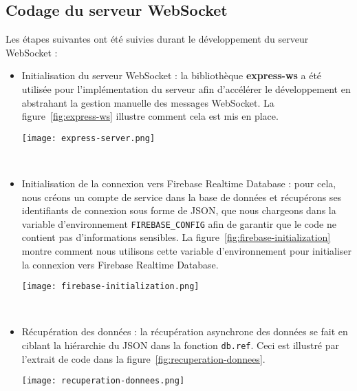 \subsection{Codage du serveur WebSocket}
Les étapes suivantes ont été suivies durant le développement du serveur WebSocket :
\begin{itemize}
\item Initialisation du serveur WebSocket : la bibliothèque \textbf{express-ws} a été utilisée pour l'implémentation du serveur afin d'accélérer le développement en abstrahant la gestion manuelle des messages WebSocket. La figure~\ref{fig:express-ws} illustre comment cela est mis en place.

\begin{minipage}{\linewidth}
  \centering
  \texttt{[image: express-server.png]}
  \label{fig:express-ws}
\end{minipage}
\\

\item Initialisation de la connexion vers Firebase Realtime Database : pour cela, nous créons un compte de service dans la base de données et récupérons ses identifiants de connexion sous forme de JSON, que nous chargeons dans la variable d'environnement \verb|FIREBASE_CONFIG| afin de garantir que le code ne contient pas d'informations sensibles. La figure~\ref{fig:firebase-initialization} montre comment nous utilisons cette variable d'environnement pour initialiser la connexion vers Firebase Realtime Database.

\begin{minipage}{\linewidth}
  \centering
  \texttt{[image: firebase-initialization.png]}
  \label{fig:firebase-initialization}
\end{minipage}
\\

\item Récupération des données : la récupération asynchrone des données se fait en ciblant la hiérarchie du JSON dans la fonction \verb|db.ref|. Ceci est illustré par l'extrait de code dans la figure~\ref{fig:recuperation-donnees}.

\begin{minipage}{\linewidth}
  \centering
  \texttt{[image: recuperation-donnees.png]}
  \label{fig:recuperation-donnees}
\end{minipage}
\\


\end{itemize}
